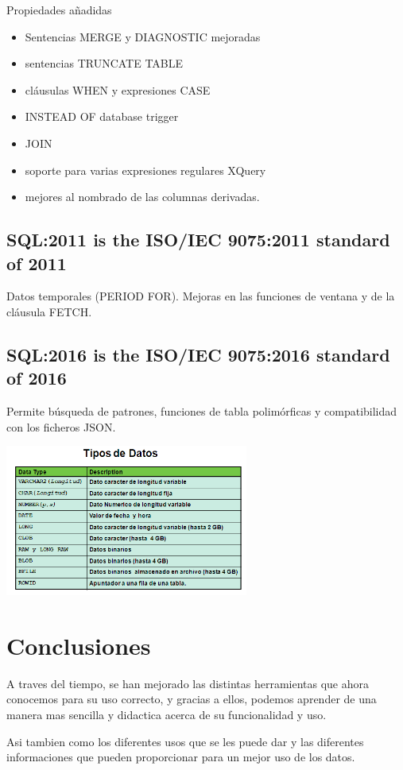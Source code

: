 \documentclass[twoside,twocolumn]{article}
\begin{document}
Propiedades añadidas
\begin{itemize}	
	\item Sentencias MERGE y DIAGNOSTIC mejoradas
	\item sentencias TRUNCATE TABLE
	\item cláusulas WHEN y expresiones CASE
	\item INSTEAD OF database trigger
	\item JOIN
	\item soporte para varias expresiones regulares XQuery
	\item mejores al nombrado de las columnas derivadas.
\end{itemize}

\subsection{SQL:2011 is the ISO/IEC 9075:2011 standard of 2011}
Datos temporales (PERIOD FOR). Mejoras en las funciones de ventana y de la cláusula FETCH.

\subsection{SQL:2016 is the ISO/IEC 9075:2016 standard of 2016}
Permite búsqueda de patrones, funciones de tabla polimórficas y compatibilidad con los ficheros JSON.

\begin{center}
	\includegraphics[width=8cm]{./Imagenes/tipo} 
\end{center}

\section{Conclusiones}
A traves del tiempo, se han mejorado las distintas herramientas que ahora conocemos para su uso correcto, y gracias a ellos, podemos aprender de una manera mas sencilla y didactica acerca de su funcionalidad y uso.

Asi tambien como los diferentes usos que se les puede dar y las diferentes informaciones que pueden proporcionar para un mejor uso de los datos.
\end{document}
